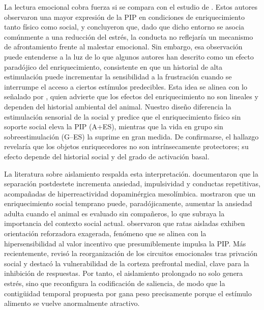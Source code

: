 \documentclass[12pt,a4paper]{article}
\begin{document}
\begin{multicols}{2}
La lectura emocional cobra fuerza si se compara con el estudio de \citet{FuentesVerdugo2023}. Estos autores observaron una mayor expresión de la PIP en condiciones de enriquecimiento tanto físico como social, y concluyeron que, dado que dicho entorno se asocia comúnmente a una reducción del estrés, la conducta no reflejaría un mecanismo de afrontamiento frente al malestar emocional. Sin embargo, esa observación puede entenderse a la luz de lo que algunos autores han descrito como un efecto paradójico del enriquecimiento, consistente en que un historial de alta estimulación puede incrementar la sensibilidad a la frustración cuando se interrumpe el acceso a ciertos estímulos predecibles. Esta idea se alinea con lo señalado por \citet{Wurbel2001}, quien advierte que los efectos del enriquecimiento no son lineales y dependen del historial ambiental del animal. Nuestro diseño diferencia la estimulación sensorial de la social y predice que el enriquecimiento físico sin soporte social eleva la PIP (A+ES), mientras que la vida en grupo sin sobreestimulación (G--ES) la suprime en gran medida. De confirmarse, el hallazgo revelaría que los objetos enriquecedores no son intrínsecamente protectores; su efecto depende del historial social y del grado de activación basal.

La literatura sobre aislamiento respalda esta interpretación. \citet{Fone2008} documentaron que la separación postdestete incrementa ansiedad, impulsividad y conductas repetitivas, acompañadas de hiperreactividad dopaminérgica mesolímbica. \citet{Branchi2006} mostraron que un enriquecimiento social temprano puede, paradójicamente, aumentar la ansiedad adulta cuando el animal es evaluado sin compañeros, lo que subraya la importancia del contexto social actual. \citet{Robbins1989} observaron que ratas aisladas exhiben orientación reforzadora exagerada, fenómeno que se alinea con la hipersensibilidad al valor incentivo que presumiblemente impulsa la PIP. Más recientemente, \citet{Arakawa2018} revisó la reorganización de los circuitos emocionales tras privación social y destacó la vulnerabilidad de la corteza prefrontal medial, clave para la inhibición de respuestas. Por tanto, el aislamiento prolongado no solo genera estrés, sino que reconfigura la codificación de saliencia, de modo que la contigüidad temporal propuesta por \citet{Killeen2013} gana peso precisamente porque el estímulo alimento se vuelve anormalmente atractivo.


\end{multicols}
\end{document}
